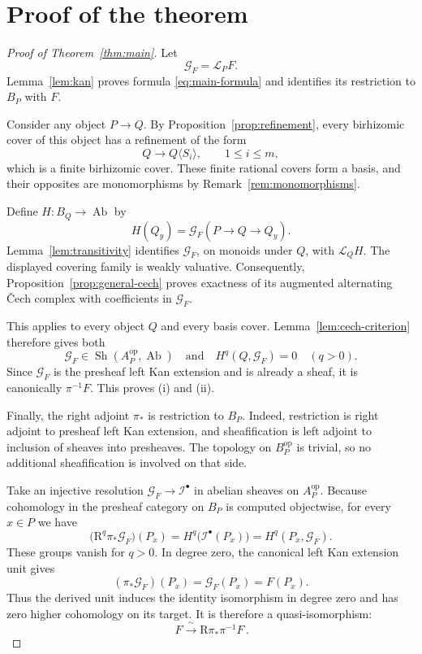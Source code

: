 \documentclass[11pt]{article}
\theoremstyle{definition}
\theoremstyle{remark}
\DeclareMathOperator{\Sh}{Sh}
\DeclareMathOperator{\Ab}{Ab}
\newcommand{\LL}{\mathcal L}
\newcommand{\cG}{\mathcal G}
\begin{document}

\section{Proof of the theorem}

\begin{proof}[Proof of Theorem~\ref{thm:main}]
Let
\[
\cG_F=\LL_PF.
\]
Lemma~\ref{lem:kan} proves formula \eqref{eq:main-formula} and
identifies its restriction to \(B_P\) with \(F\).

Consider any object \(P\to Q\). By
Proposition~\ref{prop:refinement}, every birhizomic cover of this
object has a refinement of the form
\[
Q\longrightarrow Q\langle S_i\rangle,\qquad 1\le i\le m,
\]
which is a finite birhizomic cover. These finite rational covers
form a basis, and their opposites are monomorphisms by
Remark~\ref{rem:monomorphisms}.

Define \(H:B_Q\to\Ab\) by
\[
H(Q_y)=\cG_F(P\to Q\to Q_y).
\]
Lemma~\ref{lem:transitivity} identifies \(\cG_F\), on monoids under
\(Q\), with \(\LL_QH\).
The displayed covering family is weakly valuative. Consequently,
Proposition~\ref{prop:general-cech} proves exactness of its
augmented alternating \v{C}ech complex with coefficients in
\(\cG_F\).

This applies to every object \(Q\) and every basis cover.
Lemma~\ref{lem:cech-criterion} therefore gives both
\[
\cG_F\in\Sh(A_P^{\mathrm{op}},\Ab)
\quad\text{and}\quad
H^q(Q,\cG_F)=0\quad(q>0).
\]
Since \(\cG_F\) is the presheaf left Kan extension and is already
a sheaf, it is canonically \(\pi^{-1}F\). This proves (i) and (ii).

Finally, the right adjoint \(\pi_*\) is restriction to \(B_P\).
Indeed, restriction is right adjoint to presheaf left Kan
extension, and sheafification is left adjoint to inclusion of
sheaves into presheaves. The topology on \(B_P^{\mathrm{op}}\)
is trivial, so no additional sheafification is involved on that
side.

Take an injective resolution \(\cG_F\to\mathcal I^\bullet\) in
abelian sheaves on \(A_P^{\mathrm{op}}\).
Because cohomology in the presheaf category on \(B_P\) is
computed objectwise, for every \(x\in P\) we have
\[
\bigl(\mathrm R^q\pi_*\cG_F\bigr)(P_x)
=
H^q\bigl(\mathcal I^\bullet(P_x)\bigr)
=
H^q(P_x,\cG_F).
\]
These groups vanish for \(q>0\). In degree zero, the canonical
left Kan extension unit gives
\[
(\pi_*\cG_F)(P_x)=\cG_F(P_x)=F(P_x).
\]
Thus the derived unit induces the identity isomorphism in degree
zero and has zero higher cohomology on its target. It is
therefore a quasi-isomorphism:
\[
\boxed{\,F\xrightarrow{\ \sim\ }\mathrm R\pi_*\pi^{-1}F\,}.
\]
\end{proof}
\end{document}
